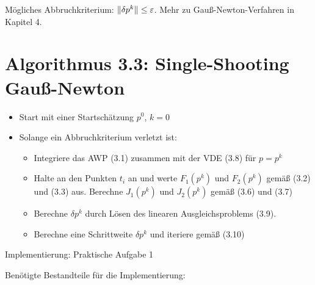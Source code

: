 
Mögliches Abbruchkriterium: $\|\delta p^k \| \leq \varepsilon$. Mehr zu Gauß-Newton-Verfahren in Kapitel\,\,4.

\section*{Algorithmus 3.3: Single-Shooting Gauß-Newton}

\begin{itemize}
\item Start mit einer Startschätzung $p^0$, $k=0$
\item Solange ein Abbruchkriterium verletzt ist:
\begin{itemize}
\item Integriere das AWP (3.1) zusammen mit der VDE (3.8) für $p=p^k$
\item Halte an den Punkten $t_i$ an und werte $F_1(p^k)$ und $F_2(p^k)$ gemäß (3.2) und (3.3) aus. Berechne $J_1(p^k)$ und $J_2(p^k)$ gemäß (3.6) und (3.7)
\item Berechne $\delta p^k$ durch Lösen des linearen Ausgleichsproblems (3.9).
\item Berechne eine Schrittweite $\delta p^k$ und iteriere gemäß (3.10)
\end{itemize}
\end{itemize}

Implementierung: Praktische Aufgabe 1

Benötigte Bestandteile für die Implementierung:

